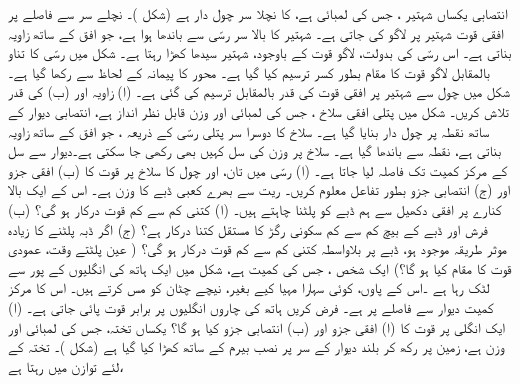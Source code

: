 انتصابی یکساں شہتیر ، جس کی لمبائی  ہے، کا  نچلا سر چول دار ہے (شکل )۔ نچلے سر سے   فاصلے پر  افقی قوت  شہتیر پر لاگو کی جاتی ہے۔ شہتیر کا  بالا سر رسّی سے باندھا ہوا ہے، جو افق کے ساتھ زاویہ  بناتی ہے۔ اس رسّی کی بدولت، لاگو قوت کے باوجود،  شہتیر سیدھا کھڑا رہتا ہے۔ شکل  میں رسّی کا تناو    بالمقابل لاگو قوت کا   مقام    بطور کسر  ترسیم کیا گیا ہے۔ محور  کا پیمانہ  کے لحاظ سے رکھا گیا ہے۔ شکل  میں چول سے شہتیر پر افقی  قوت  کی قدر   بالمقابل     ترسیم کی گئی ہے۔ (ا) زاویہ  اور (ب)  کی قدر تلاش کریں۔
شکل  میں پتلی  افقی  سلاخ ، جس کی لمبائی  اور  وزن قابل نظر انداز ہے، انتصابی دیوار کے ساتھ نقطہ  پر  چول  دار بنایا گیا ہے۔ سلاخ کا دوسرا سر  پتلی رسّی  کے ذریعہ  ، جو افق کے ساتھ زاویہ  بناتی ہے، نقطہ  سے باندھا گیا ہے۔ سلاخ پر  وزن کی سل کہیں بھی رکھی جا سکتی ہے۔دیوار سے سل کے مرکز کمیت تک فاصلہ   لیا جاتا ہے۔ (ا) رسّی میں تان، اور  چول کا سلاخ پر قوت  کا (ب) افقی جزو اور (ج) انتصابی جزو بطور تفاعل  معلوم کریں۔
ریت سے بھرے کعبی ڈبے  کا وزن  ہے۔ اس کے ایک بالا کنارے پر افقی دکھیل سے ہم ڈبے  کو پلٹنا چاہتے ہیں۔ (ا) کتنی کم سے کم قوت درکار ہو گی؟ (ب)  فرش اور ڈبے کے بیچ کم سے کم سکونی رگڑ کا مستقل کتنا درکار ہے؟ (ج)  اگر ڈبہ  پلٹنے کا  زیادہ   موثر طریقہ موجود ہو، ڈبے پر بلاواسطہ  کتنی کم سے کم قوت درکار ہو گی؟ ( عین پلٹتے وقت، عمودی قوت کا مقام کیا ہو گا؟)
ایک شخص ، جس کی کمیت  ہے،   شکل  میں ایک ہاتھ کی  انگلیوں کے پور   سے لٹک رہا ہے ۔اس کے پاوں، کوئی سہارا مہیا کیے بغیر،   نیچے چٹان کو مس کرتے ہیں۔ اس کا مرکز کمیت دیوار سے  فاصلے پر ہے۔ فرض کریں ہاتھ کی چاروں انگلیوں پر برابر قوت پائی جاتی ہے۔ (ا)   ایک انگلی  پر قوت کا  (ا) افقی جزو  اور (ب) انتصابی جزو  کیا ہو گا؟
یکساں تختہ، جس کی لمبائی  اور وزن  ہے، زمین پر رکھ کر  بلند  دیوار کے سر پر نصب   بیرم کے  ساتھ کھڑا کیا گیا ہے (شکل )۔ تختہ  کے لئے توازن میں رہتا ہے، 

